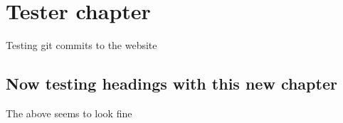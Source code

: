 \documentclass[
]{book}
\begin{document}
\hypertarget{tester-chapter}{%
\chapter{Tester chapter}\label{tester-chapter}}

Testing git commits to the website

\hypertarget{now-testing-headings-with-this-new-chapter}{%
\section{Now testing headings with this new chapter}\label{now-testing-headings-with-this-new-chapter}}

The above seems to look fine

  
\end{document}
